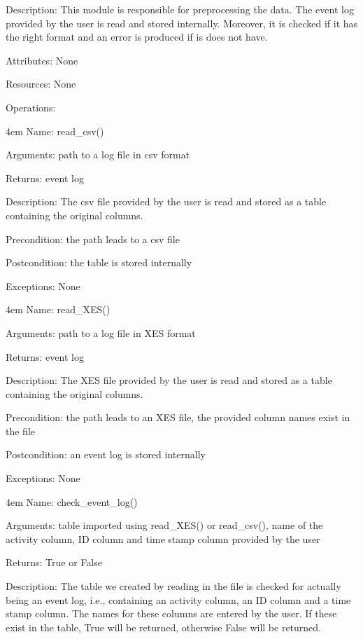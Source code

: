 \documentclass[notitlepage]{article}
\begin{document}
\begin{flushleft}
Description: This module is responsible for preprocessing the data. The event log provided by the user is read and stored internally. Moreover, it is checked if it has the right format and an error is produced if is does not have. 

Attributes: None

Resources: None

Operations: 
\medskip

\par
\begingroup
\leftskip4em
Name: read\_csv()

Arguments: path to a log file in csv format

Returns: event log 

Description: The csv file provided by the user is read and stored as a table containing the original columns.

Precondition: the path leads to a csv file

Postcondition: the table is stored internally

Exceptions: None
\par
\endgroup

\medskip

\par
\begingroup
\leftskip4em
Name: read\_XES()

Arguments: path to a log file in XES format

Returns: event log 

Description: The XES file provided by the user is read and stored as a table containing the original columns.

Precondition: the path leads to an XES file, the provided column names exist in the file

Postcondition: an event log is stored internally

Exceptions: None
\par
\endgroup

\medskip

\par
\begingroup
\leftskip4em
Name: check\_event\_log()

Arguments: table imported using read\_XES() or read\_csv(),  name of the activity column, ID column and time stamp column provided by the user

Returns: True or False

Description: The table we created by reading in the file is checked for actually being an event log, i.e., containing an activity column, an ID column and a time stamp column. The names for these columns are entered by the user. If these exist in the table, True will be returned, otherwise False will be returned. 


\end{flushleft}
\end{document}
